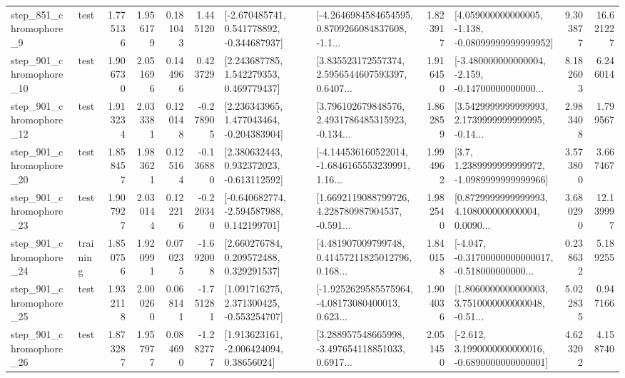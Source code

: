 \begin{tabular}{llrrrrllrlrr}
   step\_851\_chromophore\_9 &      test &      1.775136 &    1.956179 &      0.181043 &  1.445120 &   [-2.670485741, 0.541778892, -0.344687937] &  [-4.2646984584654595, 0.8709266084837608, -1.1... &       1.823917 &  [4.059000000000005, -1.138, -0.08099999999999952] &            9.303877 &         16.621227 \\
  step\_901\_chromophore\_10 &      test &      1.906730 &    2.051696 &      0.144966 &  0.423729 &     [2.243687785, 1.542279353, 0.469779437] &  [3.835523172557374, 2.5956544607593397, 0.6407... &       1.916450 &  [-3.480000000000004, -2.159, -0.14700000000000... &            8.182603 &          6.246014 \\
  step\_901\_chromophore\_12 &      test &      1.913234 &    2.033381 &      0.120148 & -0.278905 &    [2.236343965, 1.477043464, -0.204383904] &  [3.796102679848576, 2.4931786485315923, -0.134... &       1.862859 &  [3.5429999999999993, 2.1739999999999995, -0.14... &            2.983408 &          1.799567 \\
  step\_901\_chromophore\_20 &      test &      1.858457 &    1.983621 &      0.125164 & -0.136880 &    [2.380632443, 0.932372023, -0.613112592] &  [-4.144536160522014, -1.6846165553239991, 1.16... &       1.994962 &     [3.7, 1.2389999999999972, -1.0989999999999966] &            3.573800 &          3.667467 \\
  step\_901\_chromophore\_23 &      test &      1.907927 &    2.030144 &      0.122216 & -0.220340 &   [-0.640682774, -2.594587988, 0.142199701] &  [1.6692119088799726, 4.228780987904537, -0.591... &       1.982540 &  [0.8729999999999993, 4.108000000000004, 0.0090... &            3.680290 &         12.139997 \\
  step\_901\_chromophore\_24 &  training &      1.850756 &    1.920991 &      0.070235 & -1.692008 &     [2.660276784, 0.209572488, 0.329291537] &  [4.481907009799748, 0.41457211825012796, 0.168... &       1.840158 &  [-4.047, -0.31700000000000017, -0.518000000000... &            0.238632 &          5.189255 \\
  step\_901\_chromophore\_25 &      test &      1.932118 &    2.000260 &      0.068141 & -1.751281 &    [1.091716275, 2.371300425, -0.553254707] &  [-1.9252629585575964, -4.08173080400013, 0.623... &       1.904036 &  [1.8060000000000003, 3.7510000000000048, -0.51... &            5.022835 &          0.947166 \\
  step\_901\_chromophore\_26 &      test &      1.873287 &    1.957977 &      0.084690 & -1.282777 &     [1.913623161, -2.006424094, 0.38656024] &  [3.288957548665998, -3.497654118851033, 0.6917... &       2.051450 &  [-2.612, 3.1990000000000016, -0.6890000000000001] &            4.623202 &          4.158740 \\

\end{tabular}
